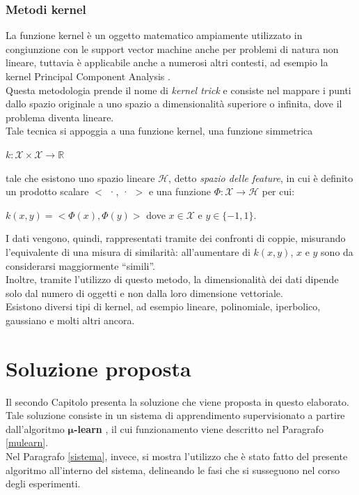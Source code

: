 \documentclass[12pt]{report}
\theoremstyle{definition}
\begin{document}
\subsection{Metodi kernel} \label{kernel}
La funzione kernel è un oggetto matematico ampiamente utilizzato in congiunzione con le support vector machine \cite{28} anche per problemi di natura non lineare, tuttavia è applicabile anche a numerosi altri contesti, ad esempio la kernel Principal Component Analysis \cite{29}.
\\
Questa metodologia prende il nome di \textit{kernel trick} e consiste nel mappare i punti dallo spazio originale a uno spazio a dimensionalità superiore o infinita, dove il problema diventa lineare.
\\
Tale tecnica si appoggia a una funzione kernel, una funzione simmetrica 
\begin{center}
    $k: \mathcal{X} \times \mathcal{X} \rightarrow \mathbb{R}$
\end{center} 
tale che esistono uno spazio lineare $\mathcal{H}$, detto \textit{spazio delle feature}, in cui è definito un prodotto scalare $<$ ·, · $>$ e una funzione $\mathit{\Phi }: \mathcal{X} \rightarrow \mathcal{H}$ per cui:
\begin{center}
    $k(x,y) = < \mathit{\Phi}(x), \mathit{\Phi}(y) >$ dove $x \in \mathcal{X}$ e $y \in \{-1,1\}$.
\end{center}
I dati vengono, quindi, rappresentati tramite dei confronti di coppie, misurando l'equivalente di una misura di similarità: all'aumentare di $k(x,y)$, $x$ e $y$ sono da considerarsi maggiormente  ``simili''.
\\
Inoltre, tramite l'utilizzo di questo metodo, la dimensionalità dei dati dipende solo dal numero di oggetti e non dalla loro dimensione vettoriale.
\\
Esistono diversi tipi di kernel, ad esempio lineare, polinomiale, iperbolico, gaussiano e molti altri ancora.

\chapter{Soluzione proposta}
\label{Capitolo 2}
\onehalfspacing
Il secondo Capitolo presenta la soluzione che viene proposta in questo elaborato.
Tale soluzione consiste in un sistema di apprendimento supervisionato a partire dall'algoritmo $\bm{\mu}$\textbf{-learn} \cite{1}, il cui funzionamento viene descritto nel Paragrafo \ref{mulearn}.
\\
Nel Paragrafo \ref{sistema}, invece, si mostra l'utilizzo che è stato fatto del presente algoritmo all'interno del sistema, delineando le fasi che si susseguono nel corso degli esperimenti.
\end{document}
